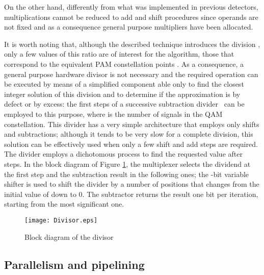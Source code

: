 \documentclass[12pt,onecolumn,draftclsnofoot]{IEEEtran}
\begin{document}
On the other hand, differently from what was implemented in previous
detectors, multiplications cannot be reduced to add and shift
procedures since operands are not fixed and as a consequence general
purpose multipliers have been allocated.


It is worth noting that, although the described technique introduces
the division , only a few values of this ratio
are of interest for the algorithm, those that correspond to the equivalent PAM
constellation points . As a consequence, a
general purpose hardware divisor is not necessary and the required
operation can be executed by means of a simplified component able only to
find the closest integer solution of this division and to determine
if the approximation is by defect or by excess: the first 
steps of a successive subtraction divider~\cite{ArithBook} can be
employed to this purpose, where  is the number of signals in
the QAM constellation. This divider has a very simple architecture
that employs only shifts and subtractions; although it tends to be
very slow for a complete division, this solution can be effectively
used when only a few shift and add steps are required. The divider employs a
dichotomous process to find the requested value after 
steps. In the block diagram of Figure \ref{Divisor}, the multiplexer
selects the dividend at the first step and the subtraction result 
in the following ones; the -bit variable shifter is
used to shift the divider by a number of positions that changes from
the initial value of  down to 0. The subtractor
returns the result one bit per iteration, starting from
the most significant one.
\begin{figure}[t!]
    \begin{center}
    \texttt{[image: Divisor.eps]} \caption{Block diagram of the divisor}
    \label{Divisor}
    \end{center}
\end{figure}


\subsection{Parallelism and pipelining}
\end{document}
